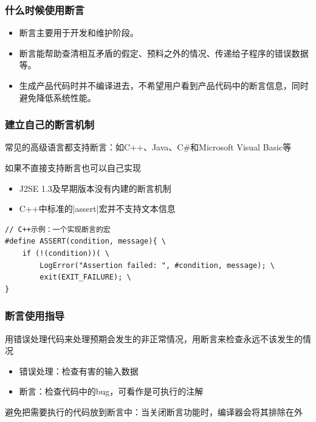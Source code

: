 \subsubsection{什么时候使用断言}
\begin{itemize}
    \item 断言主要用于开发和维护阶段。
    \item 断言能帮助查清相互矛盾的假定、预料之外的情况、传递给子程序的错误数据等。
    \item 生成产品代码时并不编译进去，不希望用户看到产品代码中的断言信息，同时避免降低系统性能。
\end{itemize}

\subsubsection{建立自己的断言机制}
常见的高级语言都支持断言：如C++、Java、C\#和Microsoft Visual Basic等

如果不直接支持断言也可以自己实现
\begin{itemize}
    \item J2SE 1.3及早期版本没有内建的断言机制
    \item C++中标准的\sverb|assert|\;宏并不支持文本信息
\end{itemize}

\begin{lstlisting}
// C++示例：一个实现断言的宏
#define ASSERT(condition, message){ \ 
    if (!(condition))( \ 
        LogError("Assertion failed: ", #condition, message); \ 
        exit(EXIT_FAILURE); \
}
\end{lstlisting}

\subsubsection{断言使用指导}
用错误处理代码来处理预期会发生的非正常情况，用断言来检查永远不该发生的情况
\begin{itemize}
    \item 错误处理：检查有害的输入数据
    \item 断言：检查代码中的bug，可看作是可执行的注解
\end{itemize}

避免把需要执行的代码放到断言中：当关闭断言功能时，编译器会将其排除在外

